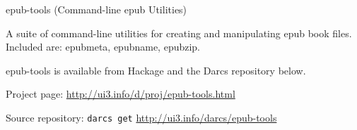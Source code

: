 \begin{hcarentry}[updated]{epub-tools (Command-line epub Utilities)}
\label{epubtools}
\makeheader

A suite of command-line utilities for creating and manipulating epub book files. Included are: epubmeta, epubname, epubzip.

epub-tools is available from Hackage and the Darcs repository below.

\FurtherReading
\begin{compactitem}
\item Project page:
\url{http://ui3.info/d/proj/epub-tools.html}

\item Source repository:
\texttt{darcs get} \url{http://ui3.info/darcs/epub-tools}
\end{compactitem}
\end{hcarentry}
